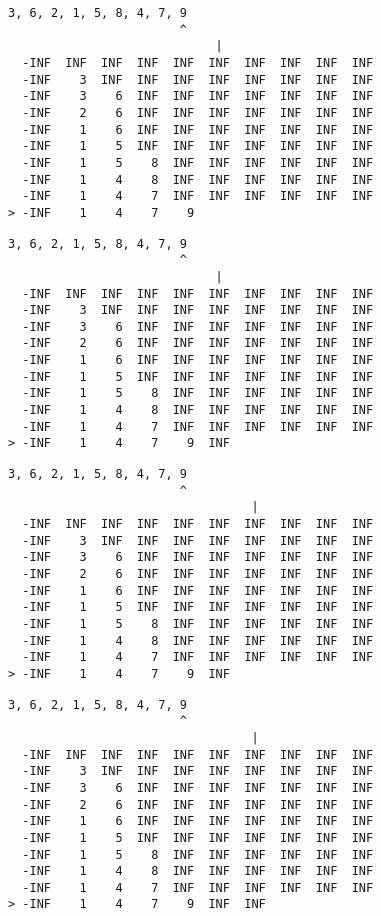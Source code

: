 { \begin{verbatim}
3, 6, 2, 1, 5, 8, 4, 7, 9
                        ^
                             |
  -INF  INF  INF  INF  INF  INF  INF  INF  INF  INF
  -INF    3  INF  INF  INF  INF  INF  INF  INF  INF
  -INF    3    6  INF  INF  INF  INF  INF  INF  INF
  -INF    2    6  INF  INF  INF  INF  INF  INF  INF
  -INF    1    6  INF  INF  INF  INF  INF  INF  INF
  -INF    1    5  INF  INF  INF  INF  INF  INF  INF
  -INF    1    5    8  INF  INF  INF  INF  INF  INF
  -INF    1    4    8  INF  INF  INF  INF  INF  INF
  -INF    1    4    7  INF  INF  INF  INF  INF  INF
> -INF    1    4    7    9                         
\end{verbatim} }

{ \begin{verbatim}
3, 6, 2, 1, 5, 8, 4, 7, 9
                        ^
                             |
  -INF  INF  INF  INF  INF  INF  INF  INF  INF  INF
  -INF    3  INF  INF  INF  INF  INF  INF  INF  INF
  -INF    3    6  INF  INF  INF  INF  INF  INF  INF
  -INF    2    6  INF  INF  INF  INF  INF  INF  INF
  -INF    1    6  INF  INF  INF  INF  INF  INF  INF
  -INF    1    5  INF  INF  INF  INF  INF  INF  INF
  -INF    1    5    8  INF  INF  INF  INF  INF  INF
  -INF    1    4    8  INF  INF  INF  INF  INF  INF
  -INF    1    4    7  INF  INF  INF  INF  INF  INF
> -INF    1    4    7    9  INF                    
\end{verbatim} }

{ \begin{verbatim}
3, 6, 2, 1, 5, 8, 4, 7, 9
                        ^
                                  |
  -INF  INF  INF  INF  INF  INF  INF  INF  INF  INF
  -INF    3  INF  INF  INF  INF  INF  INF  INF  INF
  -INF    3    6  INF  INF  INF  INF  INF  INF  INF
  -INF    2    6  INF  INF  INF  INF  INF  INF  INF
  -INF    1    6  INF  INF  INF  INF  INF  INF  INF
  -INF    1    5  INF  INF  INF  INF  INF  INF  INF
  -INF    1    5    8  INF  INF  INF  INF  INF  INF
  -INF    1    4    8  INF  INF  INF  INF  INF  INF
  -INF    1    4    7  INF  INF  INF  INF  INF  INF
> -INF    1    4    7    9  INF                    
\end{verbatim} }

{ \begin{verbatim}
3, 6, 2, 1, 5, 8, 4, 7, 9
                        ^
                                  |
  -INF  INF  INF  INF  INF  INF  INF  INF  INF  INF
  -INF    3  INF  INF  INF  INF  INF  INF  INF  INF
  -INF    3    6  INF  INF  INF  INF  INF  INF  INF
  -INF    2    6  INF  INF  INF  INF  INF  INF  INF
  -INF    1    6  INF  INF  INF  INF  INF  INF  INF
  -INF    1    5  INF  INF  INF  INF  INF  INF  INF
  -INF    1    5    8  INF  INF  INF  INF  INF  INF
  -INF    1    4    8  INF  INF  INF  INF  INF  INF
  -INF    1    4    7  INF  INF  INF  INF  INF  INF
> -INF    1    4    7    9  INF  INF               
\end{verbatim} }

